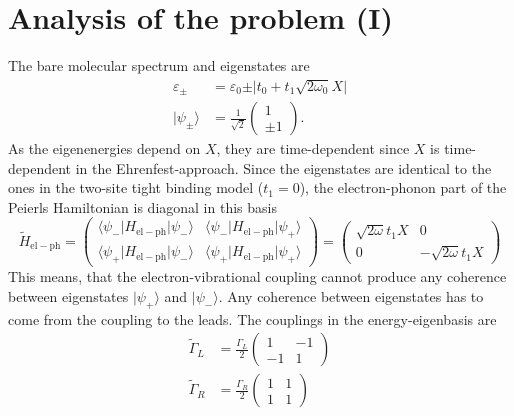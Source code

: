 \documentclass{article}
\begin{document}
\section{Analysis of the problem (I)}
The bare molecular spectrum and eigenstates are
\begin{align}
	\varepsilon_\pm &= \varepsilon_0 \pm \vert t_0 +t_1\sqrt{2\omega_0}X\vert\\
	\vert \psi_\pm\rangle &= \frac{1}{\sqrt{2}}\begin{pmatrix}
		1\\
		\pm 1
	\end{pmatrix}.\label{eq:EV_Peierls}
\end{align}
As the eigenenergies depend on $X$, they are time-dependent since $X$ is time-dependent in the Ehrenfest-approach.
Since the eigenstates are identical to the ones in the two-site tight binding model ($t_1 = 0$), the electron-phonon part of the Peierls Hamiltonian is diagonal in this basis 
\begin{equation}
	\tilde{H}_\mathrm{el-ph} = \begin{pmatrix}
		\langle \psi_- \vert H_\mathrm{el-ph}\vert \psi_-\rangle & \langle \psi_- \vert H_\mathrm{el-ph}\vert \psi_+\rangle\\
		\langle \psi_+ \vert H_\mathrm{el-ph}\vert \psi_-\rangle & \langle \psi_+ \vert H_\mathrm{el-ph}\vert \psi_+\rangle
	\end{pmatrix}
	= \begin{pmatrix}
		\sqrt{2\omega}t_1 X & 0\\
		0 & -\sqrt{2\omega}t_1 X
	\end{pmatrix}
\end{equation}
This means, that the electron-vibrational coupling cannot produce any coherence between eigenstates $\vert \psi_+\rangle$ and $\vert \psi_-\rangle$. Any coherence between eigenstates has to come from the coupling to the leads. The couplings in the energy-eigenbasis are
\begin{align}
	\tilde{\Gamma}_L &=  \frac{\Gamma_L}{2}\begin{pmatrix}
		1 & -1 \\
		-1 & 1
	\end{pmatrix}\\
	\tilde{\Gamma}_R &=  \frac{\Gamma_R}{2}\begin{pmatrix}
		1 & 1 \\
		1 & 1
	\end{pmatrix}\\
\end{align}
\end{document}
